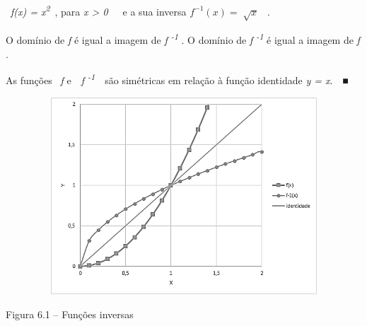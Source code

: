 \documentclass[12pt]{article}
\begin{document}
\begin{enumerate}[label*={\fontsize{14pt}{14pt}\selectfont \textbf{\arabic*.}}]
\begin{justify}
\  \textit{f(x) = x\textsuperscript{2}}\  , para \textit{x > 0}\ \ \ e a sua inversa   \( f^{-1} \left( x \right) =\sqrt[]{x} \) \  . 
\end{justify}\par

\begin{justify}
O domínio de \textit{f }é igual a imagem de \textit{f \textsuperscript{-1}} . O domínio de \textit{f \textsuperscript{-1}} é igual a imagem de \textit{f} .
\end{justify}\par

\begin{justify}
As funções \  \textit{f } e\ \  \textit{f \textsuperscript{-1}}\ \ são simétricas em relação à função identidade  \textit{y = x}.\ \  ■ 
\end{justify}\par


\vspace{\baselineskip}

\vspace{\baselineskip}



\begin{figure}[H]
	\begin{Center}
		\includegraphics[width=4.67in,height=2.9in]{./media/image3.png}
	\end{Center}
\end{figure}



\par

Figura 6.1 – Funções inversas\par



\end{enumerate}
\end{document}
